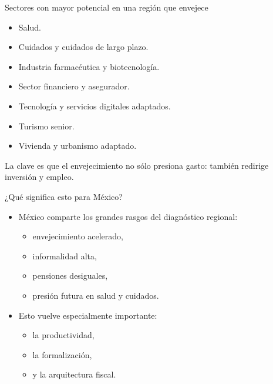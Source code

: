 \documentclass{beamer}
\begin{document}
\begin{frame}{Sectores con mayor potencial en una región que envejece}
\begin{itemize}
    \item Salud.
    \item Cuidados y cuidados de largo plazo.
    \item Industria farmacéutica y biotecnología.
    \item Sector financiero y asegurador.
    \item Tecnología y servicios digitales adaptados.
    \item Turismo senior.
    \item Vivienda y urbanismo adaptado.
\end{itemize}

\vspace{0.3cm}
La clave es que el envejecimiento no sólo presiona gasto: también redirige inversión y empleo.
\end{frame}

\begin{frame}{¿Qué significa esto para México?}
\begin{itemize}
    \item México comparte los grandes rasgos del diagnóstico regional:
    \begin{itemize}
        \item envejecimiento acelerado,
        \item informalidad alta,
        \item pensiones desiguales,
        \item presión futura en salud y cuidados.
    \end{itemize}
    \item Esto vuelve especialmente importante:
    \begin{itemize}
        \item la productividad,
        \item la formalización,
        \item y la arquitectura fiscal.
    \end{itemize}
\end{itemize}
\end{frame}
\end{document}
